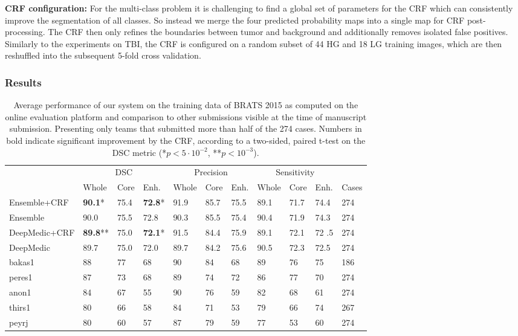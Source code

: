 \textbf{CRF configuration:} For the multi-class problem it is challenging to find a global set of parameters for the CRF which can consistently improve the segmentation of all classes. So instead we merge the four predicted probability maps into a single  map for CRF post-processing. The CRF then only refines the boundaries between tumor and background and additionally removes isolated false positives. Similarly to the experiments on TBI, the CRF is configured on a random subset of 44 HG and 18 LG training images, which are then reshuffled into the subsequent 5-fold cross validation. 

\subsubsection{Results}
\label{subsubsec:resBrats2015}



\begin{table}[!h]
\centering
\scriptsize
\caption{Average performance of our system on the training data of BRATS 2015 as computed on the online evaluation platform and comparison to other submissions visible at the time of manuscript submission. Presenting only teams that submitted more than half of the 274 cases. Numbers in bold indicate significant improvement by the CRF, according to a two-sided, paired t-test on the DSC metric (*$p<5\cdot 10^{-2}$, **$p<10^{-3}$). }
\label{table:onlineEvalBrats2015Training}
\begin{tabular}{@{}lllllllllll@{}}
\toprule
              & \multicolumn{3}{c}{DSC}  & \multicolumn{3}{c}{Precision} & \multicolumn{3}{c}{Sensitivity} &       \\ \cmidrule(lr){2-10}
              	& Whole & Core 	& Enh. 		& Whole   & Core  	& Enh.  & Whole & Core & Enh.   	& Cases \\ \midrule
              
Ensemble+CRF		& \textbf{90.1}*	&75.4	& \textbf{72.8}*	& 91.9	& 85.7	& 75.5	& 89.1	& 71.7	& 74.4	&274 \\
Ensemble			& 90.0			&75.5	& 72.8			& 90.3	& 85.5	& 75.4	& 90.4	& 71.9	& 74.3	&274 \\
DeepMedic+CRF	& \textbf{89.8}**&75.0	& \textbf{72.1}*	& 91.5	& 84.4	& 75.9	& 89.1	& 72.1	& 72	.5	&274 \\
DeepMedic		& 89.7			& 75.0	& 72.0			& 89.7	& 84.2	& 75.6	& 90.5	& 72.3	& 72.5	&274 \\

bakas1		 	& 88				& 77		& 68				& 90		& 84		& 68		& 89		& 76		& 75		&186\\
peres1		 	& 87				& 73		& 68				& 89		& 74		& 72		& 86		& 77		& 70		&274\\
anon1		 	& 84				& 67		& 55				& 90		& 76		& 59		& 82		& 68		& 61		&274\\
thirs1		 	& 80				& 66		& 58				& 84		& 71		& 53 	& 79		& 66		& 74		&267\\
peyrj			& 80				& 60		& 57				& 87		& 79		& 59		& 77		& 53		& 60		&274\\
\bottomrule
\end{tabular}
\end{table}

